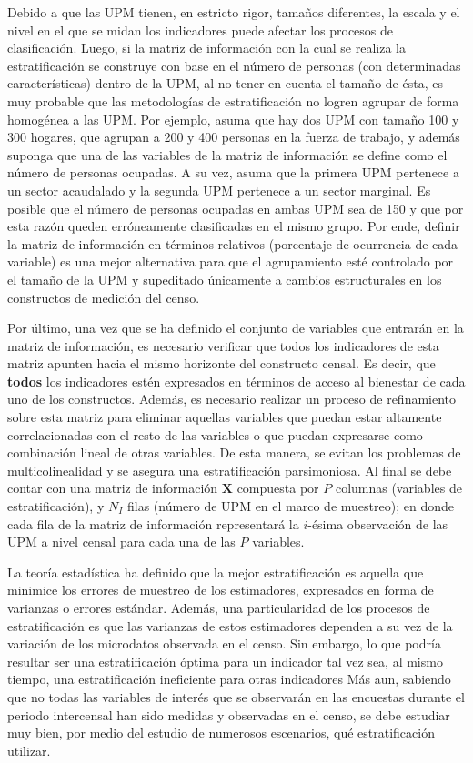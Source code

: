 \documentclass[
  12pt,
  spanish,
]{book}
\begin{document}
Debido a que las UPM tienen, en estricto rigor, tamaños diferentes, la escala y el nivel en el que se midan los indicadores puede afectar los procesos de clasificación. Luego, si la matriz de información con la cual se realiza la estratificación se construye con base en el número de personas (con determinadas características) dentro de la UPM, al no tener en cuenta el tamaño de ésta, es muy probable que las metodologías de estratificación no logren agrupar de forma homogénea a las UPM. Por ejemplo, asuma que hay dos UPM con tamaño 100 y 300 hogares, que agrupan a 200 y 400 personas en la fuerza de trabajo, y además suponga que una de las variables de la matriz de información se define como el número de personas ocupadas. A su vez, asuma que la primera UPM pertenece a un sector acaudalado y la segunda UPM pertenece a un sector marginal. Es posible que el número de personas ocupadas en ambas UPM sea de 150 y que por esta razón queden erróneamente clasificadas en el mismo grupo. Por ende, definir la matriz de información en términos relativos (porcentaje de ocurrencia de cada variable) es una mejor alternativa para que el agrupamiento esté controlado por el tamaño de la UPM y supeditado únicamente a cambios estructurales en los constructos de medición del censo.

Por último, una vez que se ha definido el conjunto de variables que entrarán en la matriz de información, es necesario verificar que todos los indicadores de esta matriz apunten hacia el mismo horizonte del constructo censal. Es decir, que \textbf{todos} los indicadores estén expresados en términos de acceso al bienestar de cada uno de los constructos. Además, es necesario realizar un proceso de refinamiento sobre esta matriz para eliminar aquellas variables que puedan estar altamente correlacionadas con el resto de las variables o que puedan expresarse como combinación lineal de otras variables. De esta manera, se evitan los problemas de multicolinealidad y se asegura una estratificación parsimoniosa. Al final se debe contar con una matriz de información \(\mathbf{X}\) compuesta por \(P\) columnas (variables de estratificación), y \(N_I\) filas (número de UPM en el marco de muestreo); en donde cada fila de la matriz de información representará la \(i\)-ésima observación de las UPM a nivel censal para cada una de las \(P\) variables.

La teoría estadística ha definido que la mejor estratificación es aquella que minimice los errores de muestreo de los estimadores, expresados en forma de varianzas o errores estándar. Además, una particularidad de los procesos de estratificación es que las varianzas de estos estimadores dependen a su vez de la variación de los microdatos observada en el censo. Sin embargo, lo que podría resultar ser una estratificación óptima para un indicador tal vez sea, al mismo tiempo, una estratificación ineficiente para otras indicadores Más aun, sabiendo que no todas las variables de interés que se observarán en las encuestas durante el periodo intercensal han sido medidas y observadas en el censo, se debe estudiar muy bien, por medio del estudio de numerosos escenarios, qué estratificación utilizar.
\end{document}
